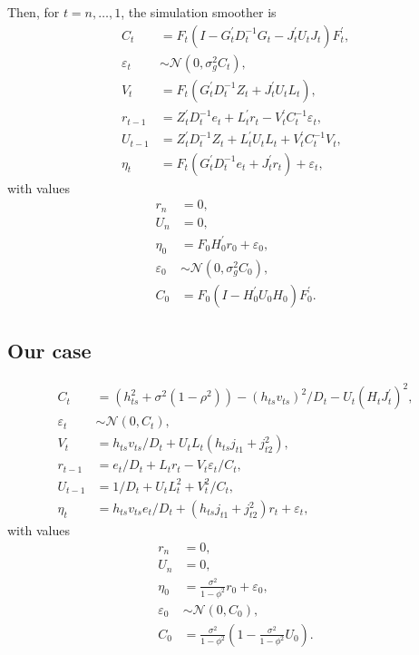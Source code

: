 \documentclass{article}
\begin{document}
Then, for $t=n,\dots,1$, the simulation smoother is
\begin{align*}
C_t & = F_t(I-G_t^\prime D_t^{-1}G_t-J_t^\prime U_tJ_t)F_t^\prime, \\
\varepsilon_t & \sim\mathcal{N}(0, \sigma_g^2C_t), \\
V_t & = F_t(G_t^\prime D_t^{-1}Z_t+J_t^\prime U_tL_t), \\
r_{t-1} & = Z_t^\prime D_t^{-1}e_t + L_t^\prime r_t-V_t^\prime C_t^{-1}\varepsilon_t, \\
U_{t-1} & = Z_t^\prime D_t^{-1}Z_t+L_t^\prime U_tL_t+V_t^\prime C_t^{-1}V_t, \\
\eta_t & = F_t(G_t^\prime D_t^{-1}e_t+J_t^\prime r_t) + \varepsilon_t,
\end{align*}
with values
\begin{align*}
r_n &=0, \\
U_n &=0, \\
\eta_0 &= F_0H_0^\prime r_0 + \varepsilon_0, \\
\varepsilon_0 &\sim\mathcal{N}(0,\sigma_g^2C_0), \\
C_0 &= F_0(I-H_0^\prime U_0H_0)F_0^\prime.
\end{align*}

\subsection{Our case}

\begin{align*}
C_t & = (h_{ts}^2 + \sigma^2(1-\rho^2))-(h_{ts}v_{ts})^2/D_t-U_t(H_tJ_t^\prime)^2, \\
\varepsilon_t & \sim\mathcal{N}(0, C_t), \\
V_t & = h_{ts}v_{ts}/D_t+U_tL_t(h_{ts}j_{t1} + j_{t2}^2), \\
r_{t-1} & = e_t/D_t + L_tr_t-V_t\varepsilon_t/C_t, \\
U_{t-1} & = 1/D_t+U_tL_t^2+V_t^2/C_t, \\
\eta_t & = h_{ts}v_{ts}e_t/D_t+(h_{ts}j_{t1} + j_{t2}^2)r_t + \varepsilon_t,
\end{align*}
with values
\begin{align*}
r_n &=0, \\
U_n &=0, \\
\eta_0 &= \frac{\sigma^2}{1-\phi^2}r_0 + \varepsilon_0, \\
\varepsilon_0 &\sim\mathcal{N}(0,C_0), \\
C_0 &= \frac{\sigma^2}{1-\phi^2}\left(1-\frac{\sigma^2}{1-\phi^2}U_0\right).
\end{align*}
\end{document}
